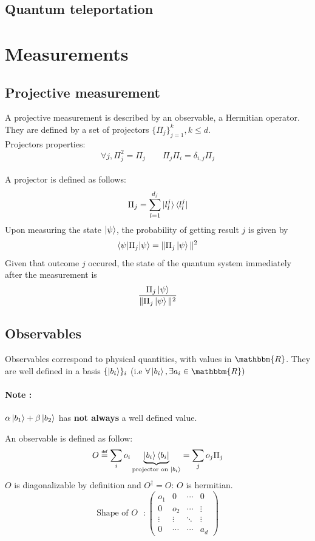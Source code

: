 \documentclass{article}
\newcommand\eqdef{\mathrel{\overset{\makebox[0pt]{\mbox{\normalfont\tiny\sffamily def}}}{=}}}
\begin{document}
\subsection{Quantum teleportation}


\section{Measurements}
\subsection{Projective measurement}
A projective measurement is described by an observable, a Hermitian operator. They are defined by a set of projectors $\{\Pi_j\}_{j=1}^k, k \leq d$.\\
Projectors properties:
\begin{equation}
    \forall j, \Pi_j^2 = \Pi_j \qquad \Pi_j\Pi_i = \delta_{i,j}\Pi_j
\end{equation}
\\\noindent
A projector is defined as follows:
\begin{equation}
    \Pi_j = \sum_{l=1}^{d_j}\ket{l_l^j}\bra{l_l^j}
\end{equation}
Upon measuring the state $\ket{\psi}$, the probability of getting result $j$ is given by
\begin{equation}
    \braket{\psi|\Pi_j|\psi} = \| \Pi_j\ket{\psi}\|^2
\end{equation}
Given that outcome $j$ occured, the state of the quantum system immediately after the measurement is
\begin{equation}
    \frac{\Pi_j\ket{\psi}}{\| \Pi_j\ket{\psi}\|^2}
\end{equation}

\subsection{Observables}
Observables correspond to physical quantities, with values in $\mathbbm{R}$.
They are well defined in a basis $\{\ket{b_i}\}_i$ (i.e $\forall \ket{b_i}, \exists a_i \in \mathbbm{R})$

\paragraph{Note :} $\alpha\ket{b_1} + \beta\ket{b_2}$ has \textbf{not always} a well defined value.

An observable is defined as follow:
\begin{equation}
    O \eqdef \sum_i o_i \underbrace{\ket{b_i}\bra{b_i}}_{\text{projector on $\ket{b_i}$}}
    = \sum_j o_j \Pi_j
\end{equation}
$O$ is diagonalizable by definition and $O^\dagger = O$: $O$ is hermitian.
$$
\text{Shape of $O$ } :
\begin{pmatrix}
    o_1 & 0 & \cdots & 0 \\
    0 & o_2 & \cdots & \vdots \\
    \vdots  & \vdots  & \ddots & \vdots  \\
    0 & \cdots & \cdots & a_d
\end{pmatrix}
$$
\end{document}
